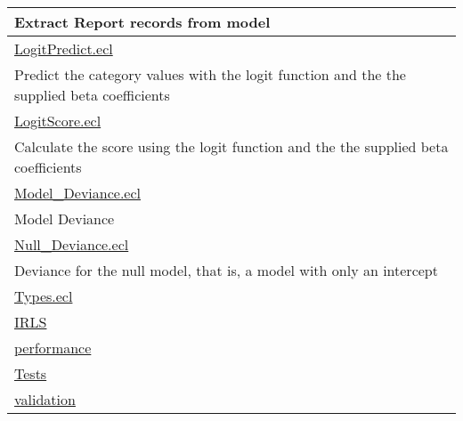 {\begin{longtable}{|p{\textwidth}|}
Extract Report records from model \\
\hline
\hyperlink{ecldoc:toc:LogitPredict}{LogitPredict.ecl} \\
Predict the category values with the logit function and the the supplied beta coefficients \\
\hline
\hyperlink{ecldoc:toc:LogitScore}{LogitScore.ecl} \\
Calculate the score using the logit function and the the supplied beta coefficients \\
\hline
\hyperlink{ecldoc:toc:Model_Deviance}{Model\_Deviance.ecl} \\
Model Deviance \\
\hline
\hyperlink{ecldoc:toc:Null_Deviance}{Null\_Deviance.ecl} \\
Deviance for the null model, that is, a model with only an intercept \\
\hline
\hyperlink{ecldoc:toc:Types}{Types.ecl} \\
\hline
\hyperlink{ecldoc:toc:root/IRLS}{IRLS} \\
\hline
\hyperlink{ecldoc:toc:root/performance}{performance} \\
\hline
\hyperlink{ecldoc:toc:root/Tests}{Tests} \\
\hline
\hyperlink{ecldoc:toc:root/validation}{validation} \\
\hline
\end{longtable}
}























